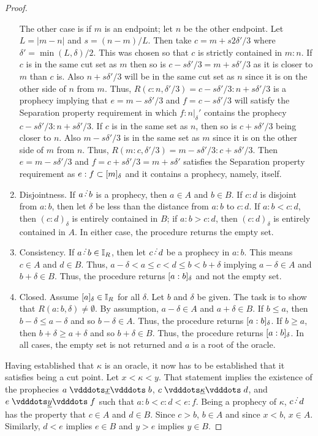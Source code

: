 \documentclass[12pt]{article}
\begin{document}
\begin{proof}
\begin{enumerate}
    The other case is if $m$ is an endpoint; let $n$ be the other endpoint. Let $L = |m-n|$ and $s = (n-m)/L$. Then take $c = m + s2\delta'/3$ where $\delta' = \min(L, \delta)/2$. This was chosen so that $c$ is strictly contained in $m:n$. If $c$ is in the same cut set as $m$ then so is $c -s \delta'/3 = m +s \delta'/3$ as it is closer to $m$ than $c$ is. Also $n + s \delta'/3$ will be in the same cut set as $n$ since it is on the other side of $n$ from $m$. Thus, $R(c:n, \delta'/3) = c-s\delta'/3 : n+s \delta'/3$ is a prophecy implying that $e=m-s\delta'/3$ and $f=c-s\delta'/3$ will satisfy the Separation property requirement in which $f:n|_\delta'$ contains  the prophecy $c-s\delta'/3 : n+s\delta'/3$. If $c$ is in the same set as $n$, then so is $c + s \delta'/3$ being closer to $n$. Also $m-s \delta'/3$ is in the same set as $m$ since it is on the other side of $m$ from $n$.  Thus, $R(m:c, \delta'/3) =  m-s\delta'/3:c+s\delta'/3$. Then $e = m-s \delta'/3$ and $f = c + s\delta'/3 = m + s\delta'$ satisfies the Separation property requirement as $e:f \subset [m]_{\delta}$ and it contains a prophecy, namely, itself. 

    \item Disjointness. If $a\lte b$ is a prophecy, then $a \in A$ and $b \in B$. If $c:d$ is disjoint from $a:b$, then let $\delta$ be less than the distance from $a:b$ to $c:d$. If $a:b < c:d$, then $(c:d)_\delta$ is entirely contained in $B$; if $a:b > c:d$, then $(c:d)_\delta$ is entirely contained in $A$. In either case, the procedure returns the empty set. 
    \item Consistency. If $a \lte b \in \mathbb{I}_R$, then let $c\lte d$ be a prophecy in $a:b$. This means $c \in A$ and $d \in B$. Thus, $a-\delta < a \leq c < d \leq b < b + \delta$ implying $a-\delta \in A$ and $b+\delta \in B$. Thus, the procedure returns $[a:b]_{\delta}$ and not the empty set. 
    \item Closed. Assume $[a]_{\delta} \in \mathbb{I}_R$ for all $\delta$. Let $b$ and $\delta$ be given. The task is to show that $R(a:b, \delta) \neq \emptyset$. By assumption, $a-\delta \in A$ and $a+\delta \in B$. If $b \leq a$, then $b-\delta \leq a- \delta$ and so $b-\delta \in A$. Thus, the procedure returns $[a:b]_{\delta}$. If $b \geq a$, then $b+\delta \geq  a+\delta$ and so $b+\delta \in B$. Thus, the procedure returns $[a:b]_{\delta}$. In all cases, the empty set is not returned and $a$ is a root of the oracle. 
\end{enumerate}

Having established that $\kappa$ is an oracle, it now has to be established that it satisfies being a cut point. Let $x < \kappa < y$. That statement implies the existence of the prophecies $a \xrel b$, $c \xrel[\kappa] d$, and $ e \xrel[y] f$ such that $a:b < c:d < e:f$. Being a prophecy of $\kappa$, $c \lte d$ has the property that $c \in A$ and $d \in B$. Since $c > b$, $b \in A$ and since $x < b$, $x \in A$. Similarly, $d < e$ implies $e \in B$ and $y > e$ implies $y \in B$.

\end{proof}
\end{document}
